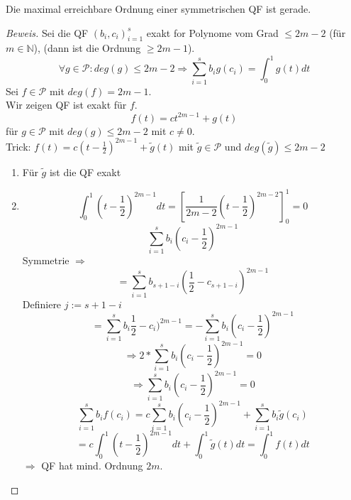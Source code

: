 \begin{theorem}
Die maximal erreichbare Ordnung einer symmetrischen QF ist gerade.
\begin{proof}[Beweis]
Sei die QF $(b_i,c_i)_{i=1}^{s}$ exakt for Polynome vom Grad $\leq 2m-2$ (für $m \in \mathbb{N}$), (dann ist die Ordnung $\geq 2m-1$).
$$\forall g \in \mathcal{P}: deg(g) \leq 2m-2 \Rightarrow \sum_{i=1}^{s} b_i g(c_i) = \int_{0}^{1} g(t) dt$$
Sei $f \in \mathcal{P}$ mit $deg(f) = 2m-1$. \\
Wir zeigen QF ist exakt für $f$. 
$$f(t) = ct^{2m-1} + g(t)$$
für $g \in \mathcal{P}$ mit $deg(g) \leq 2m-2$ mit $c \neq 0$. \\
Trick: $f(t) = c(t-\frac{1}{2})^{2m-1} + \tilde{g}(t)$ mit $\tilde{g} \in \mathcal{P}$ und $deg(\tilde{g}) \leq 2m-2$

\begin{enumerate}
  \item Für $\tilde{g}$ ist die QF exakt
  \item $$\int_0^1 (t-\frac{1}{2})^{2m-1} dt = \left[\frac{1}{2m-2}(t-\frac{1}{2})^{2m-2}\right]_0^1 = 0$$
  $$ \sum_{i=1}^{s} b_i (c_i - \frac{1}{2})^{2m-1}$$ 
  Symmetrie $\Rightarrow$
  $$= \sum_{i=1}^{s} b_{s+1-i} (\frac{1}{2} - c_{s+1-i})^{2m-1} $$
  Definiere $j := s+1-i$
  $$ = \sum_{i=1}^{s} b_i \frac{1}{2} - c_i)^{2m-1} = -\sum_{i=1}^{s} b_i (c_i - \frac{1}{2})^{2m-1}$$
  $$\Rightarrow 2*\sum_{i=1}^{s} b_i (c_i - \frac{1}{2})^{2m-1} = 0$$
  $$\Rightarrow \sum_{i=1}^{s} b_i (c_i - \frac{1}{2})^{2m-1} = 0$$
  $$\sum_{i=1}^{s}b_if(c_i) = c \sum_{i=1}^{s}b_i(c_i-\frac{1}{2})^{2m-1} + \sum_{i=1}^{s}b_i\tilde{g}(c_i)$$
  $$ = c\int_0^1(t-\frac{1}{2})^{2m-1} dt + \int_0^1 \tilde{g}(t)dt = \int_0^1 f(t)dt$$
  $\Rightarrow$ QF hat mind. Ordnung $2m$.
\end{enumerate}
\end{proof}
\end{theorem}

